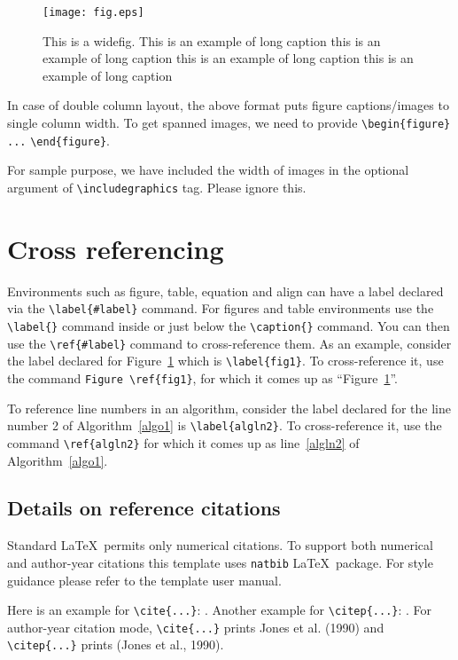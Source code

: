 \documentclass[lineno,pdflatex,sn-nature]{sn-jnl}%
\begin{document}
\begin{figure}[h]
\centering
\texttt{[image: fig.eps]}
\caption{This is a widefig. This is an example of long caption this is an example of long caption  this is an example of long caption this is an example of long caption}\label{fig1}
\end{figure}

In case of double column layout, the above format puts figure captions/images to single column width. To get spanned images, we need to provide \verb+\begin{figure}+ \verb+...+ \verb+\end{figure}+.

For sample purpose, we have included the width of images in the optional argument of \verb+\includegraphics+ tag. Please ignore this. 


\section{Cross referencing}\label{sec8}

Environments such as figure, table, equation and align can have a label
declared via the \verb+\label{#label}+ command. For figures and table
environments use the \verb+\label{}+ command inside or just
below the \verb+\caption{}+ command. You can then use the
\verb+\ref{#label}+ command to cross-reference them. As an example, consider
the label declared for Figure~\ref{fig1} which is
\verb+\label{fig1}+. To cross-reference it, use the command 
\verb+Figure \ref{fig1}+, for which it comes up as
``Figure~\ref{fig1}''. 

To reference line numbers in an algorithm, consider the label declared for the line number 2 of Algorithm~\ref{algo1} is \verb+\label{algln2}+. To cross-reference it, use the command \verb+\ref{algln2}+ for which it comes up as line~\ref{algln2} of Algorithm~\ref{algo1}.

\subsection{Details on reference citations}\label{subsec7}

Standard \LaTeX\ permits only numerical citations. To support both numerical and author-year citations this template uses \verb+natbib+ \LaTeX\ package. For style guidance please refer to the template user manual.

Here is an example for \verb+\cite{...}+: \cite{bib1}. Another example for \verb+\citep{...}+: \citep{bib2}. For author-year citation mode, \verb+\cite{...}+ prints Jones et al. (1990) and \verb+\citep{...}+ prints (Jones et al., 1990).
\end{document}
